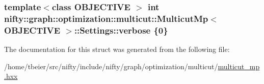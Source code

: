 \subsubsection[{verbose}]{\setlength{\rightskip}{0pt plus 5cm}template$<$class O\+B\+J\+E\+C\+T\+I\+V\+E $>$ int {\bf nifty\+::graph\+::optimization\+::multicut\+::\+Multicut\+Mp}$<$ O\+B\+J\+E\+C\+T\+I\+V\+E $>$\+::Settings\+::verbose \{0\}}\label{structnifty_1_1graph_1_1optimization_1_1multicut_1_1MulticutMp_1_1Settings_a3f5049f0159674f4c6e014c53243a17f}


The documentation for this struct was generated from the following file\+:\begin{DoxyCompactItemize}
\item 
/home/tbeier/src/nifty/include/nifty/graph/optimization/multicut/\hyperlink{multicut__mp_8hxx}{multicut\+\_\+mp.\+hxx}\end{DoxyCompactItemize}
